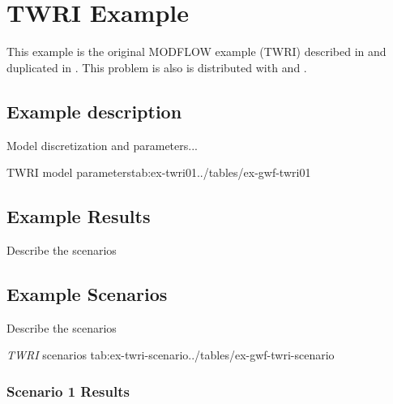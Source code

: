 \section{\mf TWRI Example}

This example is the original MODFLOW example (TWRI) described in \cite{modflow88} and duplicated in \cite{harbaugh1996user}. This problem is also is distributed with \mff \citep{modflow2005} and \mf \citep{modflow6software}.

\subsection{Example description}

Model discretization and parameters...





\begin{StandardTable}{TWRI model parameters}{tab:ex-twri01}{../tables/ex-gwf-twri01}
\end{StandardTable}

\subsection{Example Results}

Describe the scenarios

\subsection{Example Scenarios}

Describe the scenarios

\begin{ScenarioTable}{
                                   \textit{TWRI} scenarios
                                   }{tab:ex-twri-scenario}{../tables/ex-gwf-twri-scenario}
\end{ScenarioTable}


\subsubsection{Scenario 1 Results}

